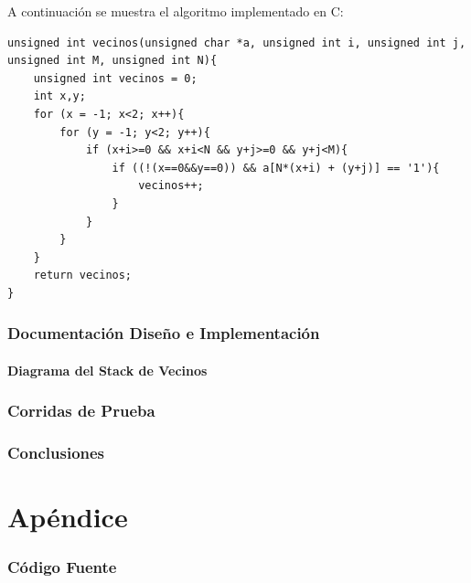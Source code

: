 \documentclass[11pt,a4paper]{article}
\begin{document}
A continuación se muestra el algoritmo implementado en C:

\begin{lstlisting}[caption={Código de la funcion vecinos},label={lst:codigoc}]
unsigned int vecinos(unsigned char *a, unsigned int i, unsigned int j, unsigned int M, unsigned int N){
	unsigned int vecinos = 0;
	int x,y;
	for (x = -1; x<2; x++){
		for (y = -1; y<2; y++){
			if (x+i>=0 && x+i<N && y+j>=0 && y+j<M){
				if ((!(x==0&&y==0)) && a[N*(x+i) + (y+j)] == '1'){
					vecinos++;
				}
			}
		}
	}
	return vecinos;
}
\end{lstlisting}

\section{Documentación Diseño e Implementación}
\subsection{Diagrama del Stack de Vecinos}

\section{Corridas de Prueba}

\section{Conclusiones}


\appendix
\part*{Apéndice}
\section{Código Fuente}
\end{document}
